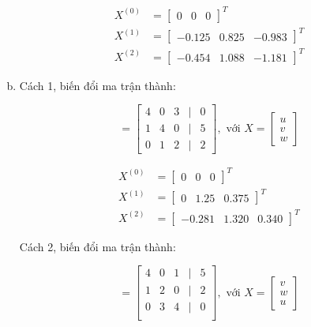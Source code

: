 \documentclass[12pt]{article}
\begin{document}
\begin{enumerate}[a)]
\begin{align*}
X^{(0)} &= \begin{bmatrix} 
0 & 0 & 0 
\end{bmatrix}^T\\
X^{(1)} &= \begin{bmatrix}
-0.125 & 0.825 & -0.983
\end{bmatrix}^T\\
X^{(2)} &= \begin{bmatrix}
-0.454 & 1.088 & -1.181
\end{bmatrix}^T
\end{align*}

\item Cách 1, biến đổi ma trận thành:

\begin{equation}
 [A|B]=\begin{bmatrix}  4 & 0 & 3 & | & 0\\ 1 & 4 & 0 & | & 5\\ 0 & 1 & 2 & | & 2 \end{bmatrix}, \textrm{~với~} X=\begin{bmatrix}  u\\v\\w \end{bmatrix}
\end{equation}

\begin{align*}
X^{(0)} &= \begin{bmatrix} 
0 & 0 & 0 
\end{bmatrix}^T\\
X^{(1)} &= \begin{bmatrix}
0 & 1.25 & 0.375
\end{bmatrix}^T\\
X^{(2)} &= \begin{bmatrix}
-0.281 & 1.320 & 0.340
\end{bmatrix}^T
\end{align*}

Cách 2, biến đổi ma trận thành:

\begin{equation}
 [A|B]=\begin{bmatrix} 4 & 0 & 1 & | & 5\\ 1 & 2 & 0 & | & 2\\ 0 & 3 & 4 & | & 0\\ \end{bmatrix}, \textrm{~với~} X=\begin{bmatrix} v\\w\\u \end{bmatrix}
\end{equation}


\end{enumerate}
\end{document}
